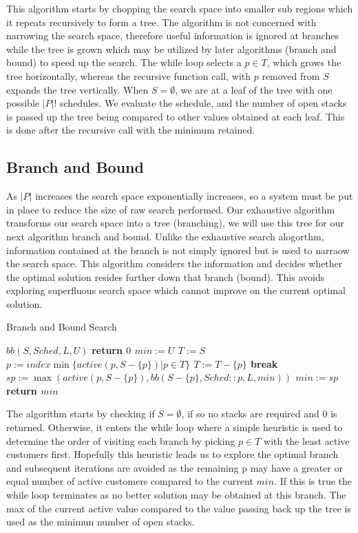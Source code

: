 This algorithm starts by chopping the search space into smaller sub regions
which it repeats recursively to form a tree. The algorithm is not concerned
with narrowing the search space, therefore useful information is ignored at
branches while the tree is grown which may be utilized by later algorithms
(branch and bound) to speed up the search. The while loop selects a $p \in T$,
which grows the tree horizontally, whereas the recursive function call, with
$p$ removed from $S$ expands the tree vertically. When $S = \emptyset$, we are
at a leaf of the tree with one possible $|P|!$ schedules. We evaluate the
schedule, and the number of open stacks is passed up the tree being compared to
other values obtained at each leaf. This is done after the recursive call with
the minimum retained.

\subsection{Branch and Bound}
As $|P|$ increases the search space exponentially increases, so a system must
be put in place to reduce the size of raw search performed. Our exhaustive
algorithm transforms our search space into a tree (branching), we will use this
tree for our next algorithm branch and bound. Unlike the exhaustive search
alogorthm, information contained at the branch is not simply ignored but is
used to narraow the search space. This algorithm considers the information and
decides whether the optimal solution resides further down that branch (bound).
This avoids exploring superfluous search space which cannot improve on the
current optimal solution.

\begin{algorithm}[H]
\caption{Branch and Bound Search}
\label{alg2}
\begin{algorithmic}
\REQUIRE $bb(S,Sched,L,U)$
\STATE \bf return $0$
\ENDIF
\STATE $min := U$
\STATE $T := S$
\STATE $p := index \min \{active(p,S-\{p\}) | p \in T\}$
\STATE $T := T - \{p\}$
\STATE \bf break
\ENDIF
\STATE $sp := \max(active(p,S-\{p\}),bb(S-\{p\},Sched::p,L,min))$
\STATE $min := sp$
\ENDIF
\STATE \bf return $min$
\ENDWHILE
\ENSURE
\end{algorithmic}
\end{algorithm}

The algorithm starts by checking if $S = \emptyset$, if so no stacks are
required and 0 is returned. Otherwise, it enters the while loop where a simple
heuristic is used to determine the order of visiting each branch by picking $p
\in T$ with the least active customers first. Hopefully this heuristic leads us
to explore the optimal branch and subsequent iterations are avoided as the
remaining p may have a greater or equal number of active customers compared to
the current $min$. If this is true the while loop terminates as no better
solution may be obtained at this branch. The max of the current active value
compared to the value passing back up the tree is used as the minimun number of
open stacks.


